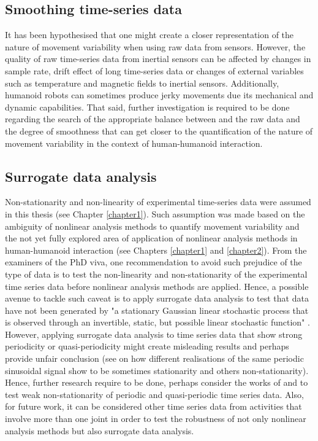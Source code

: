 \subsection*{Smoothing time-series data}
It has been hypothesised that one might create a closer 
representation of the nature of movement variability 
when using raw data from sensors.
However, the quality of raw time-series data from inertial
sensors can be affected by changes in sample rate, 
drift effect of long time-series data 
or changes of external variables such as 
temperature and magnetic fields to inertial sensors. 
Additionally, humanoid robots can sometimes produce
jerky movements due its mechanical and dynamic capabilities.
That said, further investigation is required to be done
regarding the search of the appropriate balance between 
and the raw data and the degree of smoothness 
that can get closer to the quantification of the nature of 
movement variability in the context of 
human-humanoid interaction. 

\subsection*{Surrogate data analysis}
Non-stationarity and non-linearity of experimental time-series data 
were assumed in this thesis 
(see Chapter \ref{chapter1}).
Such assumption was made based on the ambiguity of 
nonlinear analysis methods to quantify movement variability
and the not yet fully explored area of application of nonlinear analysis 
methods in human-humanoid interaction
(see Chapters \ref{chapter1} and \ref{chapter2}). 
From the examiners of the PhD viva, 
one recommendation to avoid such prejudice of the type of data  
is to test the non-linearity and non-stationarity  
of the experimental time series data before nonlinear analysis 
methods are applied.
Hence, a possible avenue to tackle such caveat 
is to apply surrogate data analysis to test that 
data have not been generated by "a stationary Gaussian linear
stochastic process that is observed through an invertible,
static, but possible linear stochastic function" 
\citep[p. 2]{schreiber2000}.
However, applying surrogate data analysis to time series data 
that show strong periodicity or quasi-periodicity 
might create misleading results and perhaps provide unfair 
conclusion 
(see 
on how different realisations of the same periodic sinusoidal signal 
show to be sometimes stationarity and others non-stationarity).
Hence, further research require to be done,
perhaps consider the works of 
\cite{stam1998} and  \cite{small2002}
to test weak non-stationarity 
of periodic and quasi-periodic time series data.
Also, for future work, 
it can be considered other time series data from 
activities that involve more than one joint 
in order to test the robustness of 
not only nonlinear analysis methods but 
also surrogate data analysis.

